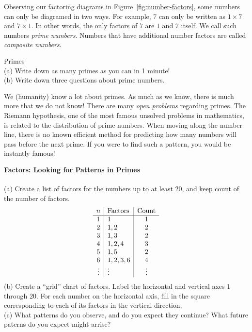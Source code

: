 \newpage 
Observing our factoring diagrams in Figure~\ref{fig:number-factors}, some numbers can only be diagramed in two ways.  For example, \(7\) can only be written as \(1 \times 7\) and \(7 \times 1\).  In other words, the only factors of \(7\) are \(1\) and \(7\) itself.  We call such numbers \emph{prime numbers}.  Numbers that have additional number factors are called \emph{composite numbers}.   
\vspace{3mm}
\begin{exercise}
	Primes
	\\ \hspace*{15mm} (a) Write down as many primes as you can in 1 minute!
	\\ \hspace*{15mm} (b) Write down three questions about prime numbers. 
	\label{ex:primelist}
\end{exercise}
\vspace{5mm}
We (humanity) know a lot about primes. 
As much as we know, there is much more that we do not know!  There are many \emph{open problems} regarding primes.  The Riemann hypothesis, one of the most famous unsolved problems in mathematics, is related to the distribution of prime numbers.  When moving along the number line, there is no known efficient method for predicting how many numbers will pass before the next prime.  If you were to find such a pattern, you would be instantly famous!  
\vspace{3mm}
\begin{exercise} \textbf{Factors: Looking for Patterns in Primes}
\\ \\
(a) Create a list of factors for the numbers up to at least \(20\), and keep count of the number of factors.  
\[ 
	\begin{array}{c | l | c}
		n & \text{Factors} & \text{Count} \\ \hline 		 
		1 & 1  & 1\\ 
		2 & 1, 2 & 2\\ 
		3 & 1, 3 & 2\\ 
		4 & 1, 2, 4 & 3\\
		5 & 1, 5 & 2 \\
		6 & 1, 2, 3, 6 & 4 \\ 
		\vdots & \vdots & \vdots  \\
	\end{array}
\]
(b) Create a ``grid'' chart of factors.  Label the horizontal and vertical axes \(1\) through \(20\).  For each number on the horizontal axis, fill in the square corresponding to each of its factors in the vertical direction.  
\\ 
(c) What patterns do you observe, and do you expect they continue?  What future paterns do you expect might arrise?
\label{ex:primepatterns}
\end{exercise}
